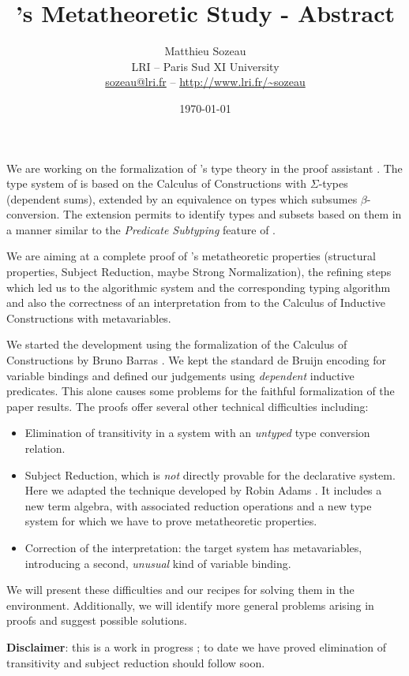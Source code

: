 \documentclass{article}
\title{\Russell's Metatheoretic Study - Abstract}
\date{\today}
\author{Matthieu Sozeau \\
  LRI -- Paris Sud XI University \\
  \url{sozeau@lri.fr} -- \url{http://www.lri.fr/~sozeau}}
\begin{document}
\maketitle

We are working on the formalization of \Russell{}'s type theory in the
\Coq{} proof assistant \cite{sozeau:coq/Russell/meta}.  The type system
of \Russell{} is based on the Calculus of Constructions with
$\Sigma$-types (dependent sums), extended by an equivalence on types
which subsumes $\beta$-conversion. The extension permits to identify
types and subsets based on them in a manner similar to the
\emph{Predicate Subtyping} feature of \PVS{}.

We are aiming at a complete proof of \Russell{}'s metatheoretic properties
(structural properties, Subject Reduction, maybe Strong Normalization),
the refining steps which led us to the algorithmic system and the
corresponding typing algorithm and also the correctness of an interpretation
from \Russell{} to the Calculus of Inductive Constructions with
metavariables.

We started the development using the formalization of the Calculus of
Constructions by Bruno Barras \cite{Barras96a}.  We kept the standard de
Bruijn encoding for variable bindings and defined our judgements using
\emph{dependent} inductive predicates.  This alone causes some problems
for the faithful formalization of the paper results.  The proofs offer
several other technical difficulties including:
\begin{itemize}
\item Elimination of transitivity in a system with an \emph{untyped} type
  conversion relation.

\item Subject Reduction, which is \emph{not} directly provable for the
  declarative system. Here we adapted the technique developed by
  Robin Adams \cite{adams:PTSEQ}. It includes a new term algebra, with
  associated reduction operations and a new type system
  for which we have to prove metatheoretic properties.

\item Correction of the interpretation: the target system has
  metavariables, introducing a second, \emph{unusual} kind of variable
  binding.
\end{itemize}

We will present these difficulties and our recipes for solving them in
the \Coq environment. Additionally, we will identify more general
problems arising in \Coq proofs and suggest possible solutions. 

{\bf Disclaimer}: this is a work in
progress ; to date we have proved elimination of transitivity and
subject reduction should follow soon.




\end{document}
